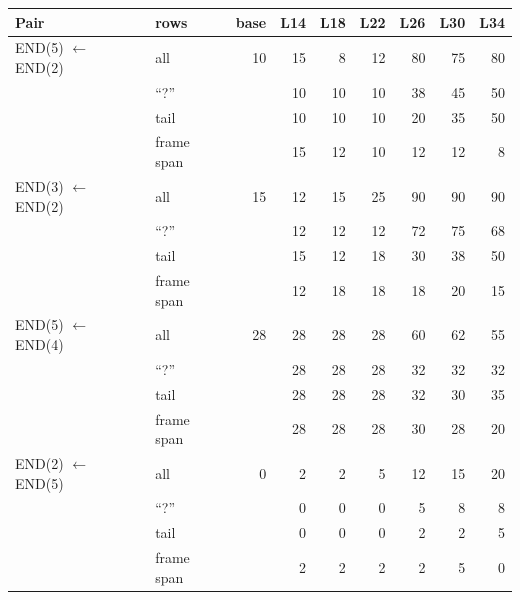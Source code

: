\begin{tabular}{llrrrrrrr}
\toprule
Pair & rows & base & L14 & L18 & L22 & L26 & L30 & L34 \\
\midrule
END(5) $\leftarrow$ END(2) & all & 10 & 15 & 8 & 12 & 80 & 75 & 80 \\
 & ``?'' &  & 10 & 10 & 10 & 38 & 45 & 50 \\
 & tail &  & 10 & 10 & 10 & 20 & 35 & 50 \\
 & frame span &  & 15 & 12 & 10 & 12 & 12 & 8 \\
\addlinespace
END(3) $\leftarrow$ END(2) & all & 15 & 12 & 15 & 25 & 90 & 90 & 90 \\
 & ``?'' &  & 12 & 12 & 12 & 72 & 75 & 68 \\
 & tail &  & 15 & 12 & 18 & 30 & 38 & 50 \\
 & frame span &  & 12 & 18 & 18 & 18 & 20 & 15 \\
\addlinespace
END(5) $\leftarrow$ END(4) & all & 28 & 28 & 28 & 28 & 60 & 62 & 55 \\
 & ``?'' &  & 28 & 28 & 28 & 32 & 32 & 32 \\
 & tail &  & 28 & 28 & 28 & 32 & 30 & 35 \\
 & frame span &  & 28 & 28 & 28 & 30 & 28 & 20 \\
\addlinespace
END(2) $\leftarrow$ END(5) & all & 0 & 2 & 2 & 5 & 12 & 15 & 20 \\
 & ``?'' &  & 0 & 0 & 0 & 5 & 8 & 8 \\
 & tail &  & 0 & 0 & 0 & 2 & 2 & 5 \\
 & frame span &  & 2 & 2 & 2 & 2 & 5 & 0 \\
\bottomrule
\end{tabular}
